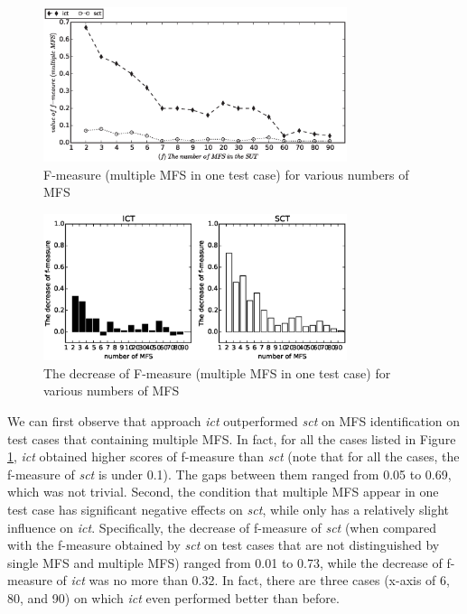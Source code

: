 \documentclass[journal,12pt,onecolumn,draftclsnofoot,]{IEEEtran}
\begin{document}
\begin{figure}[htbp]
 \includegraphics[width=3.5in]{fmeasuremulti.eps}
\caption{F-measure (multiple MFS in one test case) for various numbers of MFS}
\label{sen_mfs_multi_tests_result}
\end{figure}

\begin{figure}[htbp]
 \includegraphics[width=3.5in]{decreasingoffmeasure.eps}
\caption{The decrease of F-measure (multiple MFS in one test case) for various numbers of MFS}
\label{decrease_sen_mfs_multi_tests_result}
\end{figure}

We can first observe that approach \emph{ict} outperformed \emph{sct} on MFS identification on test cases that containing multiple MFS. In fact, for all the cases listed in Figure \ref{sen_mfs_multi_tests_result}, \emph{ict} obtained higher scores of f-measure than \emph{sct} (note that for all the cases, the f-measure of \emph{sct} is under 0.1). The gaps between them ranged from 0.05 to 0.69, which was not trivial. Second, the condition that multiple MFS appear in one test case has significant negative effects on \emph{sct}, while only has a relatively slight influence on \emph{ict}. Specifically, the decrease of f-measure of \emph{sct} (when compared with the f-measure obtained by \emph{sct} on test cases that are not distinguished by single MFS and multiple MFS) ranged from 0.01 to 0.73, while the decrease of f-measure of \emph{ict} was no more than 0.32. In fact, there are three cases (x-axis of 6, 80, and 90) on which \emph{ict} even performed better than before.
\end{document}
